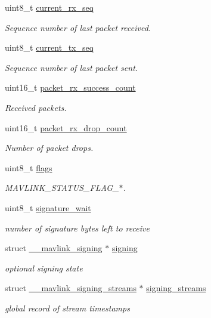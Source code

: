 \begin{DoxyCompactItemize}
uint8\+\_\+t \mbox{\hyperlink{struct____mavlink__status_affbdd32b3dff8ae35327a79ed6b17646}{current\+\_\+rx\+\_\+seq}}
\begin{DoxyCompactList}\small\item\em Sequence number of last packet received. \end{DoxyCompactList}\item 
uint8\+\_\+t \mbox{\hyperlink{struct____mavlink__status_a06482d6c3fbfa829526c9b2e2e895f32}{current\+\_\+tx\+\_\+seq}}
\begin{DoxyCompactList}\small\item\em Sequence number of last packet sent. \end{DoxyCompactList}\item 
uint16\+\_\+t \mbox{\hyperlink{struct____mavlink__status_aa088f67773cdf9ff541c5880e65cee68}{packet\+\_\+rx\+\_\+success\+\_\+count}}
\begin{DoxyCompactList}\small\item\em Received packets. \end{DoxyCompactList}\item 
uint16\+\_\+t \mbox{\hyperlink{struct____mavlink__status_a1a1f510b9484e705c971f20fd1d61912}{packet\+\_\+rx\+\_\+drop\+\_\+count}}
\begin{DoxyCompactList}\small\item\em Number of packet drops. \end{DoxyCompactList}\item 
uint8\+\_\+t \mbox{\hyperlink{struct____mavlink__status_a2b67d268b29712b9607d1796228a77a2}{flags}}
\begin{DoxyCompactList}\small\item\em M\+A\+V\+L\+I\+N\+K\+\_\+\+S\+T\+A\+T\+U\+S\+\_\+\+F\+L\+A\+G\+\_\+$\ast$. \end{DoxyCompactList}\item 
uint8\+\_\+t \mbox{\hyperlink{struct____mavlink__status_afbdd26652864ceeccf1155287752496c}{signature\+\_\+wait}}
\begin{DoxyCompactList}\small\item\em number of signature bytes left to receive \end{DoxyCompactList}\item 
struct \mbox{\hyperlink{struct____mavlink__signing}{\+\_\+\+\_\+mavlink\+\_\+signing}} $\ast$ \mbox{\hyperlink{struct____mavlink__status_a12ca1a2ade1b6b83d87a8cd7553884a9}{signing}}
\begin{DoxyCompactList}\small\item\em optional signing state \end{DoxyCompactList}\item 
struct \mbox{\hyperlink{struct____mavlink__signing__streams}{\+\_\+\+\_\+mavlink\+\_\+signing\+\_\+streams}} $\ast$ \mbox{\hyperlink{struct____mavlink__status_ab0e29fe56be92a4bbd722529ac76bd84}{signing\+\_\+streams}}
\begin{DoxyCompactList}\small\item\em global record of stream timestamps \end{DoxyCompactList}\end{DoxyCompactItemize}


